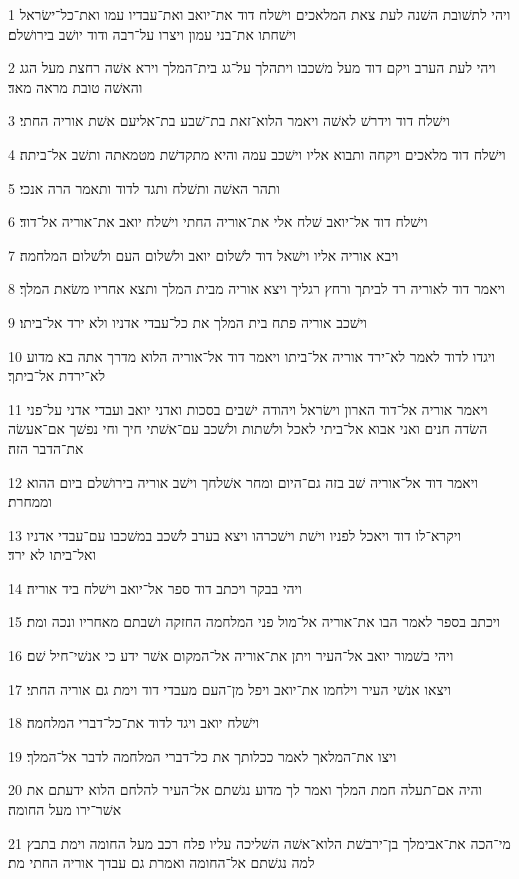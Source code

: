 \par 1 ויהי לתשׁובת השׁנה לעת צאת המלאכים וישׁלח דוד את־יואב ואת־עבדיו עמו ואת־כל־ישׂראל וישׁחתו את־בני עמון ויצרו על־רבה ודוד יושׁב בירושׁלם׃
\par 2 ויהי לעת הערב ויקם דוד מעל משׁכבו ויתהלך על־גג בית־המלך וירא אשׁה רחצת מעל הגג והאשׁה טובת מראה מאד׃
\par 3 וישׁלח דוד וידרשׁ לאשׁה ויאמר הלוא־זאת בת־שׁבע בת־אליעם אשׁת אוריה החתי׃
\par 4 וישׁלח דוד מלאכים ויקחה ותבוא אליו וישׁכב עמה והיא מתקדשׁת מטמאתה ותשׁב אל־ביתה׃
\par 5 ותהר האשׁה ותשׁלח ותגד לדוד ותאמר הרה אנכי׃
\par 6 וישׁלח דוד אל־יואב שׁלח אלי את־אוריה החתי וישׁלח יואב את־אוריה אל־דוד׃
\par 7 ויבא אוריה אליו וישׁאל דוד לשׁלום יואב ולשׁלום העם ולשׁלום המלחמה׃
\par 8 ויאמר דוד לאוריה רד לביתך ורחץ רגליך ויצא אוריה מבית המלך ותצא אחריו משׂאת המלך׃
\par 9 וישׁכב אוריה פתח בית המלך את כל־עבדי אדניו ולא ירד אל־ביתו׃
\par 10 ויגדו לדוד לאמר לא־ירד אוריה אל־ביתו ויאמר דוד אל־אוריה הלוא מדרך אתה בא מדוע לא־ירדת אל־ביתך׃
\par 11 ויאמר אוריה אל־דוד הארון וישׂראל ויהודה ישׁבים בסכות ואדני יואב ועבדי אדני על־פני השׂדה חנים ואני אבוא אל־ביתי לאכל ולשׁתות ולשׁכב עם־אשׁתי חיך וחי נפשׁך אם־אעשׂה את־הדבר הזה׃
\par 12 ויאמר דוד אל־אוריה שׁב בזה גם־היום ומחר אשׁלחך וישׁב אוריה בירושׁלם ביום ההוא וממחרת׃
\par 13 ויקרא־לו דוד ויאכל לפניו וישׁת וישׁכרהו ויצא בערב לשׁכב במשׁכבו עם־עבדי אדניו ואל־ביתו לא ירד׃
\par 14 ויהי בבקר ויכתב דוד ספר אל־יואב וישׁלח ביד אוריה׃
\par 15 ויכתב בספר לאמר הבו את־אוריה אל־מול פני המלחמה החזקה ושׁבתם מאחריו ונכה ומת׃
\par 16 ויהי בשׁמור יואב אל־העיר ויתן את־אוריה אל־המקום אשׁר ידע כי אנשׁי־חיל שׁם׃
\par 17 ויצאו אנשׁי העיר וילחמו את־יואב ויפל מן־העם מעבדי דוד וימת גם אוריה החתי׃
\par 18 וישׁלח יואב ויגד לדוד את־כל־דברי המלחמה׃
\par 19 ויצו את־המלאך לאמר ככלותך את כל־דברי המלחמה לדבר אל־המלך׃
\par 20 והיה אם־תעלה חמת המלך ואמר לך מדוע נגשׁתם אל־העיר להלחם הלוא ידעתם את אשׁר־ירו מעל החומה׃
\par 21 מי־הכה את־אבימלך בן־ירבשׁת הלוא־אשׁה השׁליכה עליו פלח רכב מעל החומה וימת בתבץ למה נגשׁתם אל־החומה ואמרת גם עבדך אוריה החתי מת׃
